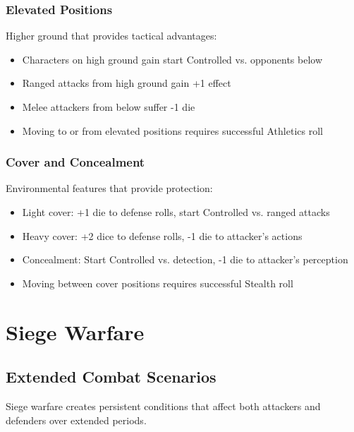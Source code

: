 \subsubsection{Elevated Positions}
Higher ground that provides tactical advantages:
\begin{itemize}[leftmargin=*]
    \item Characters on high ground gain start Controlled vs. opponents below
    \item Ranged attacks from high ground gain +1 effect
    \item Melee attackers from below suffer -1 die
    \item Moving to or from elevated positions requires successful Athletics roll
\end{itemize}

\subsubsection{Cover and Concealment}
Environmental features that provide protection:
\begin{itemize}[leftmargin=*]
    \item Light cover: +1 die to defense rolls, start Controlled vs. ranged attacks
    \item Heavy cover: +2 dice to defense rolls, -1 die to attacker's actions
    \item Concealment: Start Controlled vs. detection, -1 die to attacker's perception
    \item Moving between cover positions requires successful Stealth roll
\end{itemize}

\newpage

\section{Siege Warfare}

\subsection{Extended Combat Scenarios}

Siege warfare creates persistent conditions that affect both attackers and defenders over extended periods.

